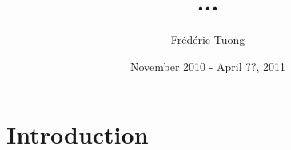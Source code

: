 \documentclass[a4paper, 11pt]{article}
\author{Frédéric Tuong}
\title{...}
\date{November 2010 - April ??, 2011}
\newcommand{\simsoc}{SimSoC\xspace}
\newcommand{\SScert}{SimSoC-Cert\xspace}
\begin{document}
\maketitle

\section{Introduction}

\end{document}
